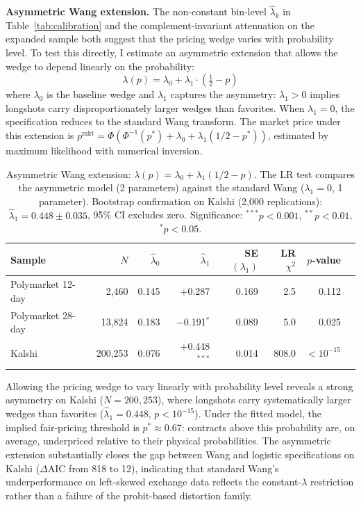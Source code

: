 \documentclass[12pt,a4paper]{article}
\begin{document}
\textbf{Asymmetric Wang extension.} The non-constant bin-level
\(\hat{\lambda}_k\) in Table~\ref{tab:calibration} and
the complement-invariant attenuation on the expanded sample both suggest
that the pricing wedge varies with probability level. To test this
directly, I estimate an asymmetric extension that allows the wedge to
depend linearly on the probability:
\[\lambda(p) = \lambda_0 + \lambda_1 \cdot (\tfrac{1}{2} - p)\] where
\(\lambda_0\) is the baseline wedge and \(\lambda_1\) captures the
asymmetry: \(\lambda_1 > 0\) implies longshots carry disproportionately
larger wedges than favorites. When \(\lambda_1 = 0\), the specification
reduces to the standard Wang transform. The market price under this
extension is
\(p^{\text{mkt}} = \Phi(\Phi^{-1}(p^*) + \lambda_0 + \lambda_1(1/2 - p^*))\),
estimated by maximum likelihood with numerical inversion.

\begin{table}[H]
\centering
\small
\caption{Asymmetric Wang extension: $\lambda(p) = \lambda_0 + \lambda_1(1/2 - p)$. The LR test compares the asymmetric model (2 parameters) against the standard Wang ($\lambda_1 = 0$, 1 parameter). Bootstrap confirmation on Kalshi (2,000 replications): $\hat{\lambda}_1 = 0.448 \pm 0.035$, 95\% CI excludes zero. Significance: $^{***}p<0.001$, $^{**}p<0.01$, $^{*}p<0.05$.}
\label{tab:asymmetric_wang}
\begin{tabular}{lrrrrrrr}
\toprule
Sample & $N$ & $\hat{\lambda}_0$ & $\hat{\lambda}_1$ & SE$(\lambda_1)$ & LR $\chi^2$ & $p$-value \\
\midrule
Polymarket 12-day & 2,460 & 0.145 & $+$0.287 & 0.169 & 2.5 & 0.112 \\
Polymarket 28-day & 13,824 & 0.183 & $-$0.191$^{*}$ & 0.089 & 5.0 & 0.025 \\
Kalshi & 200,253 & 0.076 & $+$0.448$^{***}$ & 0.014 & 808.0 & $<10^{-15}$ \\
\bottomrule
\end{tabular}
\end{table}

Allowing the pricing wedge to vary linearly with probability level
reveals a strong asymmetry on Kalshi (\(N = 200{,}253\)), where
longshots carry systematically larger wedges than favorites
(\(\hat{\lambda}_1 = 0.448\), \(p < 10^{-15}\)). Under the fitted model,
the implied fair-pricing threshold is \(p^* \approx 0.67\): contracts
above this probability are, on average, underpriced relative to their
physical probabilities. The asymmetric extension substantially closes
the gap between Wang and logistic specifications on Kalshi
(\(\Delta\text{AIC}\) from 818 to 12), indicating that standard Wang's
underperformance on left-skewed exchange data reflects the
constant-\(\lambda\) restriction rather than a failure of the
probit-based distortion family.
\end{document}
